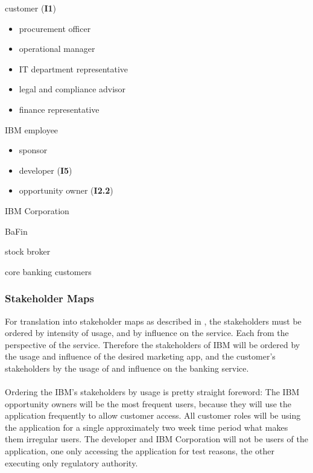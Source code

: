 \vspace{2em}


\begin{closeItemCol}
    \item customer (\textbf{I1})
    \begin{itemize}
        \item procurement officer
        \item operational manager
        \item IT department representative
        \item legal and compliance advisor
        \item finance representative
    \end{itemize}
    \item IBM employee 
    \begin{itemize}
        \item sponsor
        \item developer (\textbf{I5})
        \item opportunity owner (\textbf{I2.2})
    \end{itemize}
    \item IBM Corporation
    \columnbreak
    \item BaFin
    \item stock broker
    \item core banking customers
\end{closeItemCol}

\subsubsection{Stakeholder Maps}
For translation into stakeholder maps as described in , the stakeholders must be ordered by intensity of usage, and by influence on the service. Each from the perspective of the service. Therefore the stakeholders of IBM will be ordered by the usage and influence of the desired marketing app, and the customer's stakeholders by the usage of and influence on the banking service.

\paragraph{}
Ordering the IBM's stakeholders by usage is pretty straight foreword: The IBM opportunity owners will be the most frequent users, because they will use the application frequently to allow customer access. All customer roles will be using the application for a single approximately two week time period what makes them irregular users.
The developer and IBM Corporation will not be users of the application, one only accessing the application for test reasons, the other executing only regulatory authority. 

